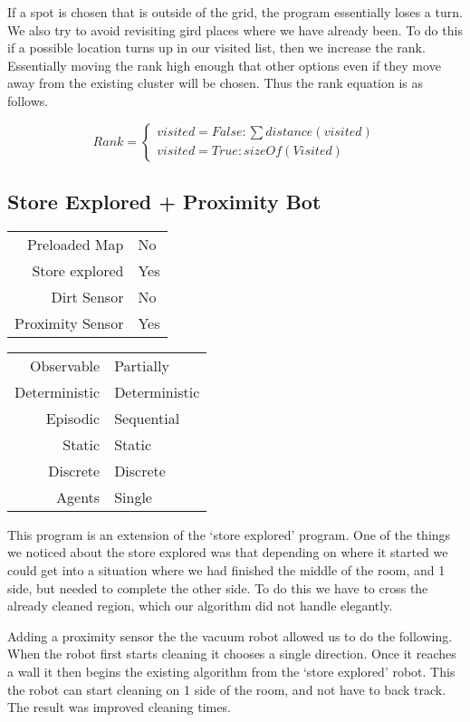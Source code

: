 \documentclass[letterpaper]{article}
\begin{document}
If a spot is chosen that is outside of the grid, the program essentially loses a turn.  We also try to avoid revisiting gird places where we have already been.  To do this if a possible location turns up in our visited list, then we increase the rank.  Essentially moving the rank high enough that other options even if they move away from the existing cluster will be chosen.  Thus the rank equation is as follows.

\[
  Rank=
	\begin{cases}
		visited=False: \sum{distance(visited)}\\
		visited=True: sizeOf(Visited)
	\end{cases}
\]

\subsection{Store Explored + Proximity Bot}

\begin{tabular}{ r | l }  
	Preloaded Map 		& No \\
	Store explored 		& Yes \\
	Dirt Sensor 		& No \\
	Proximity Sensor 	& Yes \\
\end{tabular}
\quad
\begin{tabular}{ r | l }  
	Observable		& Partially 	\\
	Deterministic	& Deterministic	\\
	Episodic		& Sequential	\\
	Static		 	& Static 		\\
	Discrete 		& Discrete 		\\
	Agents		 	& Single 		\\	
\end{tabular}
This program is an extension of the `store explored' program.  One of the things we noticed about the store explored was that depending on where it started we could get into a situation where we had finished the middle of the room, and 1 side, but needed to complete the other side.  To do this we have to cross the already cleaned region, which our algorithm did not handle elegantly.

Adding a proximity sensor the the vacuum robot allowed us to do the following.  When the robot first starts cleaning it chooses a single direction.  Once it reaches a wall it then begins the existing algorithm from the `store explored' robot.  This the robot can start cleaning on 1 side of the room, and not have to back track.  The result was improved cleaning times.
\end{document}
